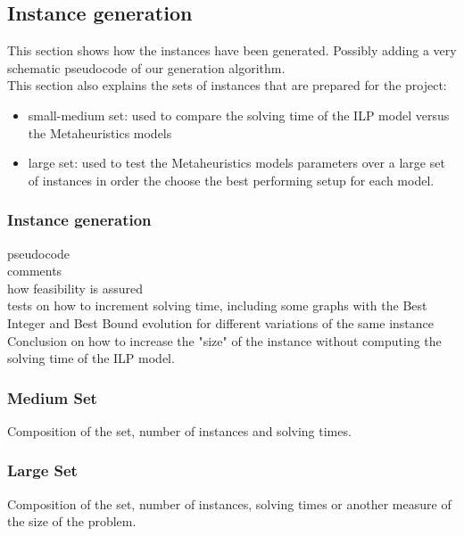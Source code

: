 \subsection{Instance generation}

This section shows how the instances have been generated. Possibly adding a very schematic pseudocode of our generation algorithm.\\

This section also explains the sets of instances that are prepared for the project:\\
\begin{itemize}
	\item small-medium set: used to compare the solving time of the ILP model versus the Metaheuristics models
	\item large set: used to test the Metaheuristics models parameters over a large set of instances in order the choose the best performing setup for each model.
\end{itemize} 

\subsubsection{Instance generation}

pseudocode\\
comments\\
how feasibility is assured\\
tests on how to increment solving time, including some graphs with the Best Integer and Best Bound evolution for different variations of the same instance\\
Conclusion on how to increase the "size" of the instance without computing the solving time of the ILP model.

\subsubsection{Medium Set}

Composition of the set, number of instances and solving times.

\subsubsection{Large Set}

Composition of the set, number of instances, solving times or another measure of the size of the problem.


\pagebreak
